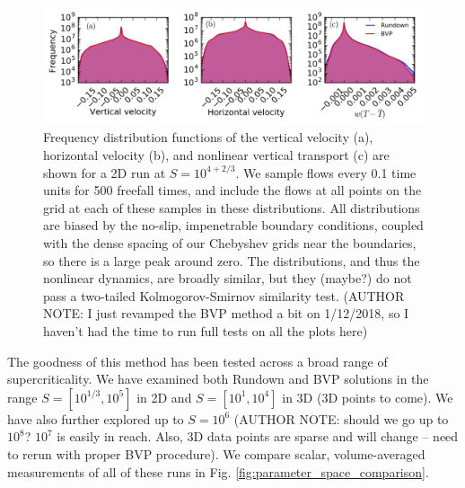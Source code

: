 \documentclass[aps, pre, onecolumn, nofootinbib, notitlepage, groupedaddress, amsfonts, amssymb, amsmath, longbibliography]{revtex4-1}
\begin{document}
\begin{figure}[t]
\includegraphics[width=\textwidth]{./figs/pdf_comparison.png}
\caption{Frequency distribution functions of the vertical velocity (a), horizontal velocity (b), and nonlinear
vertical transport (c) are shown for a 2D run at $S = 10^{4 + 2/3}$.  We sample flows every 0.1 time units for 500 freefall
times, and include the flows at all points on the grid at each of these samples in these distributions.  All
distributions are biased by the no-slip, impenetrable boundary conditions, coupled with the dense spacing of our
Chebyshev grids near the boundaries, so there is a large peak around zero. The distributions, and thus the nonlinear
dynamics, are broadly similar, but they  (maybe?) do not pass a two-tailed Kolmogorov-Smirnov similarity test. (AUTHOR NOTE: 
I just revamped the BVP method a bit on 1/12/2018, so I haven't had the time to run full tests on all the plots here)
\label{fig:pdf_comparison} }
\end{figure}


The goodness of this method has been tested across a broad range of supercriticality.  We have
examined both Rundown and BVP solutions in the range $S = [10^{1/3}, 10^5]$ in 2D and
$S = [10^1, 10^4]$ in 3D (3D points to come).  We have also further explored up to $S = 10^6$
(AUTHOR NOTE: should we go up to $10^8$?  $10^7$ is easily in reach. Also, 3D data points are
sparse and will change -- need to rerun with proper BVP procedure).  We compare scalar, 
volume-averaged measurements of all of these runs in Fig. \ref{fig:parameter_space_comparison}.
\end{document}
